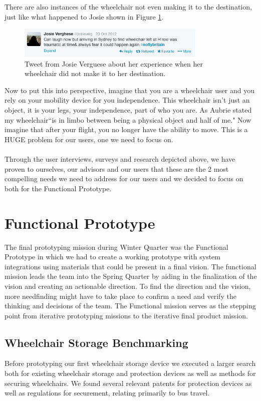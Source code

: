 There are also instances of the wheelchair not even making it to the destination, just like what happened to Josie shown in Figure \ref{fig:leftwheelchair.png}. 

\begin{figure}[h]
  \centering
     \includegraphics[width=9cm]{images/leftwheelchair.png}
   \caption{Tweet from Josie Verguese about her experience when her wheelchair did not make it to her destination.}
  \label{fig:leftwheelchair.png}
\end{figure}

Now to put this into perspective, imagine that you are a wheelchair user and you rely on your mobility device for you independence. This wheelchair isn't just an object, it is your legs, your independence, part of who you are. As Aubrie stated  my wheelchair``is in limbo between being a physical object and half of me." Now imagine that after your flight, you no longer have the ability to move. This is a HUGE problem for our users, one we need to focus on. \\
\\

 Through  the user interviews, surveys and research depicted above, we have proven to ourselves, our advisors and our users that these are the 2 most compelling needs we need to address for our users and we decided to focus on both for the Functional Prototype. 


\section{Functional Prototype}
The final prototyping mission during Winter Quarter was the Functional Prototype in which we had to create a working prototype with system integrations using materials that could be present in a final vision. The functional mission leads the team into the Spring Quarter by aiding in the finalization of the vision and creating an actionable direction.  To find the direction and the vision, more needfinding might have to take place to confirm a need and verify the thinking and decisions of the team. The Functional mission serves as the stepping point from iterative prototyping missions to the iterative final product mission.

\subsection{Wheelchair Storage Benchmarking}
Before prototyping our first wheelchair storage device we executed a larger search both for existing wheelchair storage and protection devices as well as methods for securing wheelchairs. We found several relevant patents for protection devices as well as regulations for securement, relating primarily to bus travel. \\

